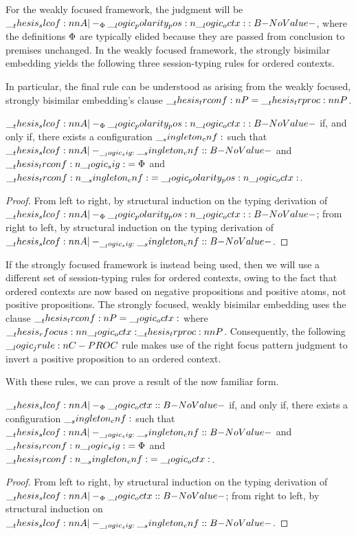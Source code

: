 For the weakly focused framework, the judgment will be $\slcof{A |-_{\orsig} \p{\octx} : B}$, where the definitions $\Phi$ are typically elided because they are passed from conclusion to premises unchanged.
In the weakly focused framework, the strongly bisimilar embedding yields the following three session-typing rules for ordered contexts.
In particular, the final rule can be understood as arising from the weakly focused, strongly bisimilar embedding's clause $\trconf{P} = \trproc{P}$.

\begin{theorem}
  $\slcof{A |-_{\orsig} \p{\octx} : B}$ if, and only if, there exists a configuration $\__singleton_cnf:$ such that $\slcof{A |-_{\sig} \cnf : B}$ and $\__thesis_trconf:n {\__logic_sig:} = \Phi$ and $\__thesis_trconf:n {\__singleton_cnf:} = \__logic_polarity_pos:n {\__logic_octx:}$.
\end{theorem}
\begin{proof}
  From left to right, by structural induction on the typing derivation of $\slcof{A |-_{\orsig} \p{\octx} : B}$;
  from right to left, by structural induction on the typing derivation of $\slcof{A |-_{\sig} \cnf : B}$.
\end{proof}

If the strongly focused framework is instead being used, then we will use a different set of session-typing rules for ordered contexts, owing to the fact that ordered contexts are now based on negative propositions and positive atoms, not positive propositions.
The strongly focused, weakly bisimilar embedding uses the clause $\__thesis_trconf:n {P} = \__logic_octx:$ where $\rfocus{\octx}{\trproc{P}}$.
Consequently, the following $\__logic_jrule:n {C-PROC}$ rule makes use of the right focus pattern judgment to invert a positive proposition to an ordered context.
With these rules, we can prove a result of the now familiar form.
\begin{theorem}
  $\slcof{A |-_{\orsig} \octx : B}$ if, and only if, there exists a configuration $\__singleton_cnf:$ such that $\slcof{A |-_{\sig} \cnf : B}$ and $\__thesis_trconf:n {\__logic_sig:} = \Phi$ and $\__thesis_trconf:n {\__singleton_cnf:} = \__logic_octx:$.
\end{theorem}
\begin{proof}
  From left to right, by structural induction on the typing derivation of $\slcof{A |-_{\orsig} \octx : B}$;
  from right to left, by structural induction on $\slcof{A |-_{\sig} \cnf : B}$.
\end{proof}






